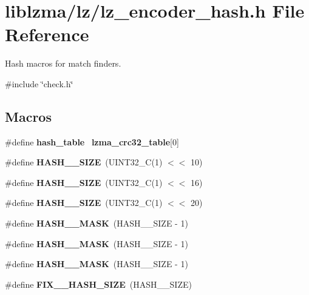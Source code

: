 \section{liblzma/lz/lz\+\_\+encoder\+\_\+hash.h File Reference}
\label{lz__encoder__hash_8h}


Hash macros for match finders.  


{\ttfamily \#include \char`\"{}check.\+h\char`\"{}}\newline
\subsection*{Macros}
\begin{DoxyCompactItemize}
\item 
\mbox{\label{lz__encoder__hash_8h_a2376b5aab98fe359d071d7e48d0e942d}} 
\#define {\bfseries hash\+\_\+table}~\textbf{ lzma\+\_\+crc32\+\_\+table}[0]
\item 
\mbox{\label{lz__encoder__hash_8h_a47e9576ccf51512a660a2b5e1af33c09}} 
\#define {\bfseries H\+A\+S\+H\+\_\+\_\+\+S\+I\+ZE}~(U\+I\+N\+T32\+\_\+C(1) $<$$<$ 10)
\item 
\mbox{\label{lz__encoder__hash_8h_af082dc83659e29389678a357b4210b72}} 
\#define {\bfseries H\+A\+S\+H\+\_\+\_\+\+S\+I\+ZE}~(U\+I\+N\+T32\+\_\+C(1) $<$$<$ 16)
\item 
\mbox{\label{lz__encoder__hash_8h_a3b018ce8da57d501b6375a80312f4705}} 
\#define {\bfseries H\+A\+S\+H\+\_\+\_\+\+S\+I\+ZE}~(U\+I\+N\+T32\+\_\+C(1) $<$$<$ 20)
\item 
\mbox{\label{lz__encoder__hash_8h_a53e9aa7ea2ae54690f8d354c3ed17e62}} 
\#define {\bfseries H\+A\+S\+H\+\_\+\_\+\+M\+A\+SK}~(H\+A\+S\+H\+\_\+\_\+\+S\+I\+ZE -\/ 1)
\item 
\mbox{\label{lz__encoder__hash_8h_aeb4a855156405dca899ad209a7633dae}} 
\#define {\bfseries H\+A\+S\+H\+\_\+\_\+\+M\+A\+SK}~(H\+A\+S\+H\+\_\+\_\+\+S\+I\+ZE -\/ 1)
\item 
\mbox{\label{lz__encoder__hash_8h_ae45735bb29fcec47c5bb078a68640931}} 
\#define {\bfseries H\+A\+S\+H\+\_\+\_\+\+M\+A\+SK}~(H\+A\+S\+H\+\_\+\_\+\+S\+I\+ZE -\/ 1)
\item 
\mbox{\label{lz__encoder__hash_8h_a5b1c35c794abd8e8f500bb6acc4f091f}} 
\#define {\bfseries F\+I\+X\+\_\+\_\+\+H\+A\+S\+H\+\_\+\+S\+I\+ZE}~(H\+A\+S\+H\+\_\+\_\+\+S\+I\+ZE)
\item 
\mbox{\label{lz__encoder__hash_8h_ac06dae597c60252db2062da38c5e312e}} 
$$
\end{DoxyCompactItemize}
